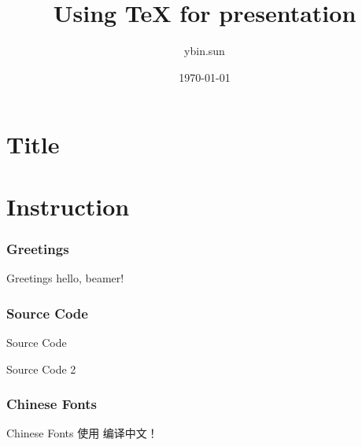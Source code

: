 ﻿\documentclass[xcolor=svgnames]{beamer}
\title{Using \TeX{} for presentation}
\author{ybin.sun}
\institute{\texttt{ybin.sun@gmail.com}}
\date{\today}
\begin{document}


\part[Title]{Title}
\begin{frame}[plain]
  \titlepage
\end{frame}


\part[Instruction]{Instruction}
\section[Greetings]{Greetings}
\begin{frame}{Greetings}
hello, beamer!
\end{frame}

\section[Source Code]{Source Code}
\begin{frame}{Source Code}

\end{frame}

\begin{frame}{Source Code 2}
  
\end{frame}


\section[Chinese Fonts]{Chinese Fonts}
\begin{frame}{Chinese Fonts}
使用 \XeTeX{} 编译中文！
\end{frame}
\end{document}
